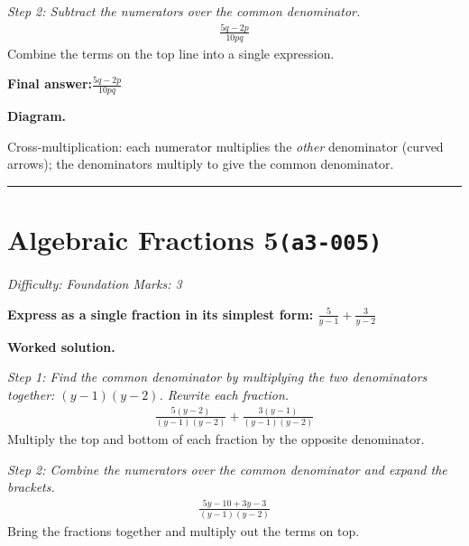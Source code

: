 \documentclass[11pt]{article}
\newcommand{\question}[1]{\par\medskip\noindent\textbf{#1}\par}
\begin{document}
\textit{Step 2: Subtract the numerators over the common denominator.}
\[\begin{gathered}
\frac{5q - 2p}{10pq}
\end{gathered}\]
Combine the terms on the top line into a single expression.

\begin{answerbox}
\textbf{Final answer:}\quad \(\displaystyle \frac{5q - 2p}{10pq}\)
\end{answerbox}
\textbf{Diagram.}

\begin{center}
\end{center}
\small Cross-multiplication: each numerator multiplies the \emph{other} denominator (curved arrows); the denominators multiply to give the common denominator.\normalsize

\medskip\hrule

\section*{Algebraic Fractions 5\quad\small\texttt{(a3-005)}}
\textit{Difficulty: Foundation \quad\textbar\quad Marks: 3}

\question{Express as a single fraction in its simplest form: \( \frac{5}{y-1} + \frac{3}{y-2} \)}

\textbf{Worked solution.}

\textit{Step 1: Find the common denominator by multiplying the two denominators together: \( (y-1)(y-2) \). Rewrite each fraction.}
\[\begin{gathered}
\frac{5(y-2)}{(y-1)(y-2)} + \frac{3(y-1)}{(y-1)(y-2)}
\end{gathered}\]
Multiply the top and bottom of each fraction by the opposite denominator.

\textit{Step 2: Combine the numerators over the common denominator and expand the brackets.}
\[\begin{gathered}
\frac{5y - 10 + 3y - 3}{(y-1)(y-2)}
\end{gathered}\]
Bring the fractions together and multiply out the terms on top.
\end{document}
